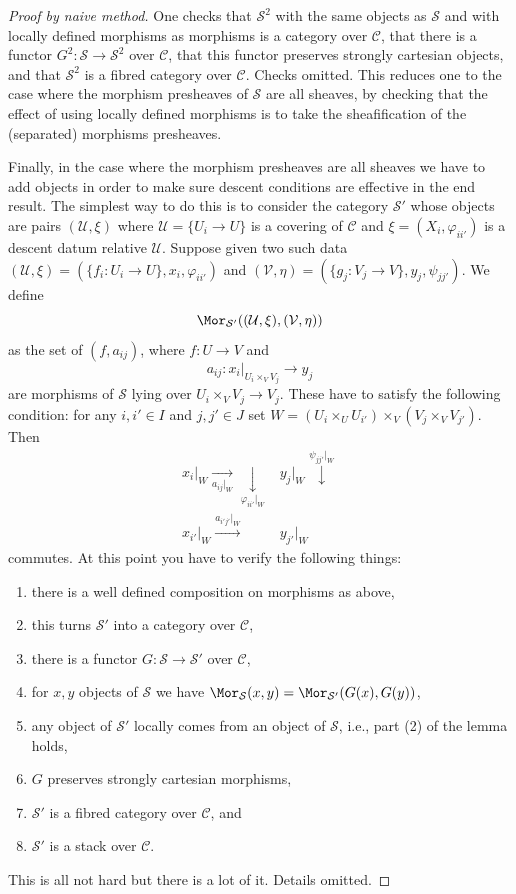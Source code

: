 \begin{proof}[Proof by naive method]
\medskip\noindent
One checks that $\mathcal{S}^2$ with the same objects as
$\mathcal{S}$ and with locally defined morphisms as morphisms
is a category over $\mathcal{C}$, that there is a functor
$G^2 : \mathcal{S} \to \mathcal{S}^2$ over $\mathcal{C}$,
that this functor preserves strongly cartesian objects,
and that $\mathcal{S}^2$ is a fibred category over $\mathcal{C}$.
Checks omitted. This reduces one to the case where the
morphism presheaves of $\mathcal{S}$ are all sheaves, by
checking that the effect of using locally defined morphisms
is to take the sheafification of the (separated) morphisms
presheaves.

\medskip\noindent
Finally, in the case where the morphism presheaves are all sheaves
we have to add objects in order to make sure descent conditions are
effective in the end result. The simplest way to do this is to
consider the category $\mathcal{S}'$ whose objects are
pairs $(\mathcal{U}, \xi)$ where
$\mathcal{U} = \{U_i \to U\}$ is a covering of $\mathcal{C}$ and
$\xi = (X_i, \varphi_{ii'})$ is a descent datum relative $\mathcal{U}$.
Suppose given two such data
$(\mathcal{U}, \xi) = (\{f_i : U_i \to U\},  x_i, \varphi_{ii'})$ and
$(\mathcal{V}, \eta) = (\{g_j : V_j \to V\},  y_j, \psi_{jj'})$.
We define
$$
\Mor_{\mathcal{S}'}((\mathcal{U}, \xi), (\mathcal{V}, \eta))
$$
as the set of $(f, a_{ij})$, where $f : U \to V$ and
$$
a_{ij} :
x_i|_{U_i \times_V V_j}
\longrightarrow
y_j
$$
are morphisms of $\mathcal{S}$ lying over $U_i \times_V V_j \to V_j$.
These have to satisfy the following condition: for any
$i, i' \in I$ and $j, j' \in J$ set
$W = (U_i \times_U U_{i'}) \times_V (V_j \times_V V_{j'})$. Then
$$
\begin{array}{cc}x_i|_W \underset{a_{ij}|_W}{\longrightarrow}\underset{\varphi_{ii'}|_W}{\downarrow} & y_j|_W \overset{\psi_{jj'}|_W}{\downarrow} \\ x_{i'}|_W \overset{a_{i'j'}|_W}{\longrightarrow} & y_{j'}|_W\end{array}
$$
commutes. At this point you have to verify the following things:
\begin{enumerate}
\item there is a well defined composition on morphisms as above,
\item this turns $\mathcal{S}'$ into a category over $\mathcal{C}$,
\item there is a functor $G : \mathcal{S} \to \mathcal{S}'$ over $\mathcal{C}$,
\item for $x, y$ objects of $\mathcal{S}$ we have
$\Mor_\mathcal{S}(x, y) = \Mor_{\mathcal{S}'}(G(x), G(y))$,
\item any object of $\mathcal{S}'$ locally comes from an object of
$\mathcal{S}$, i.e., part (2) of the lemma holds,
\item $G$ preserves strongly cartesian morphisms,
\item $\mathcal{S}'$ is a fibred category over $\mathcal{C}$, and
\item $\mathcal{S}'$ is a stack over $\mathcal{C}$.
\end{enumerate}
This is all not hard but there is a lot of it. Details omitted.
\end{proof}

